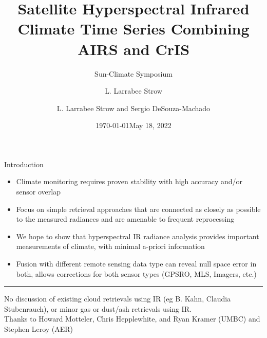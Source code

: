 \documentclass[10pt,t]{beamer}
\author{L. Larrabee Strow}
\date{\today}
\title{\large Satellite Hyperspectral Infrared Climate Time Series Combining AIRS and CrIS}
\subtitle{\footnotesize{Sun-Climate Symposium}}
\date{\vspace{0.1in}\footnotesize{May 18, 2022 \vfill}}
\author{L. Larrabee Strow\inst{1} and Sergio DeSouza-Machado\inst{1}}
\institute[UMBC]{\inst{1} UMBC Physics Dept.}
\begin{document}
\maketitle
\begin{frame}[label={sec:org78d47e3}]{Introduction}
\vspace{-0.15in}
\small
\begin{itemize}
\item Climate monitoring requires proven stability with high accuracy and/or sensor overlap

\item Focus on simple retrieval approaches that are connected as closely as possible to the measured radiances and are amenable to frequent reprocessing

\item We hope to show that hyperspectral IR radiance analysis provides important measurements of climate, with minimal a-priori information

\item Fusion with different remote sensing data type can reveal null space error in both, allows corrections for both sensor types (GPSRO, MLS, Imagers, etc.)
\end{itemize}

\vspace{-0.15in}
\rule{\linewidth}{0.01in}
\vspace{-0.2in}

\footnotesize
No discussion of  existing cloud retrievals using IR (eg B. Kahn, Claudia Stubenrauch), or minor gas or 
dust/ash retrievals using IR.   \\
\vspace{0.03in}
Thanks to Howard Motteler, Chris Hepplewhite, and Ryan Kramer (UMBC) and Stephen Leroy (AER)
\end{frame}
\end{document}
